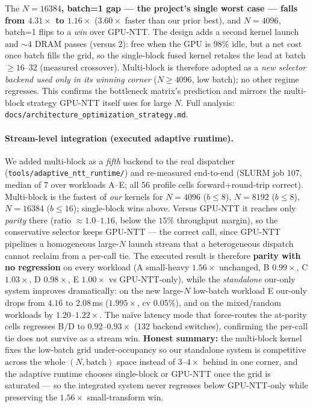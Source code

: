 \documentclass[11pt,a4paper]{article}
\begin{document}
The \textbf{$N{=}16384$, batch=1 gap --- the project's single worst case --- falls from
$4.31\times$ to $1.16\times$} ($3.60\times$ faster than our prior best), and $N{=}4096$, batch=1
flips to a \emph{win} over GPU-NTT. The design adds a second kernel launch and ${\sim}4$ DRAM passes
(versus $2$): free when the GPU is $98\%$ idle, but a net cost once batch fills the grid, so the
single-block fused kernel retakes the lead at batch $\ge 16$--$32$ (measured crossover). Multi-block
is therefore adopted as a \emph{new selector backend used only in its winning corner}
($N\ge4096$, low batch); no other regime regresses. This confirms the bottleneck matrix's
prediction and mirrors the multi-block strategy GPU-NTT itself uses for large $N$. Full analysis:
\texttt{docs/architecture\_optimization\_strategy.md}.

\paragraph{Stream-level integration (executed adaptive runtime).} We added multi-block as a
\emph{fifth} backend to the real dispatcher (\texttt{tools/adaptive\_ntt\_runtime/}) and re-measured
end-to-end (SLURM job 107, median of 7 over workloads A--E; all 56 profile cells forward$+$round-trip
correct). Multi-block is the fastest of \emph{our} kernels for $N{=}4096$ ($b{\le}8$), $N{=}8192$
($b{\le}8$), $N{=}16384$ ($b{\le}16$); single-block wins above. Versus GPU-NTT it reaches only
\emph{parity} there (ratio ${\approx}1.0$--$1.16$, below the $15\%$ throughput margin), so the
conservative selector keeps GPU-NTT --- the correct call, since GPU-NTT pipelines a homogeneous
large-$N$ launch stream that a heterogeneous dispatch cannot reclaim from a per-call tie. The
executed result is therefore \textbf{parity with no regression} on every workload (A small-heavy
$1.56\times$ unchanged, B $0.99\times$, C $1.03\times$, D $0.98\times$, E $1.00\times$ vs
GPU-NTT-only), while the \emph{standalone} our-only system improves dramatically: on the new large-$N$
low-batch workload E our-only drops from $4.16$ to $2.08$\,ms ($\mathbf{1.995\times}$, cv $0.05\%$),
and on the mixed/random workloads by $1.20$--$1.22\times$. The naïve latency mode that force-routes
the at-parity cells regresses B/D to $0.92$--$0.93\times$ (132 backend switches), confirming the
per-call tie does not survive as a stream win. \textbf{Honest summary:} the multi-block kernel fixes
the low-batch grid under-occupancy so our standalone system is competitive across the whole
$(N,\text{batch})$ space instead of $3$--$4\times$ behind in one corner, and the adaptive runtime
chooses single-block or GPU-NTT once the grid is saturated --- so the integrated system never
regresses below GPU-NTT-only while preserving the $1.56\times$ small-transform win.
\end{document}
